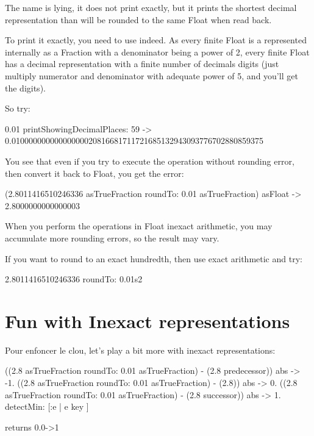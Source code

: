 \documentclass[a4paper,10pt,twoside]{book}
\begin{document}
   
   
   
The name  is lying, it does not print exactly,
but it prints the shortest decimal representation than will be rounded
to the same Float when read back.

To print it exactly, you need to use  indeed.
As every finite Float is a represented internally as a Fraction with a
denominator being a power of 2, every finite Float has a decimal
representation with a finite number of decimals digits (just multiply
numerator and denominator with adequate power of 5, and you'll get the
digits).

So try:

\begin{code}{}
0.01 printShowingDecimalPlaces: 59
-> 0.01000000000000000020816681711721685132943093776702880859375
\end{code}

You see that even if you try to execute the operation without rounding
error, then convert it back to Float, you get the error:

\begin{code}{}
(2.8011416510246336 asTrueFraction roundTo: 0.01 asTrueFraction) asFloat
->  2.8000000000000003
\end{code}

When you perform the  operations in Float inexact arithmetic,
you may accumulate more rounding errors, so the result may vary.

If you want to round to an exact hundredth, then use exact arithmetic and try:

\begin{code}{}
  2.8011416510246336 roundTo: 0.01s2
\end{code}





\section{Fun with Inexact representations}
Pour enfoncer le clou, let's play a bit more with inexact representations:

\begin{code}{}
{
((2.8 asTrueFraction roundTo: 0.01 asTrueFraction) - (2.8
predecessor)) abs -> -1.
((2.8 asTrueFraction roundTo: 0.01 asTrueFraction) - (2.8)) abs -> 0.
((2.8 asTrueFraction roundTo: 0.01 asTrueFraction) - (2.8 successor)) abs -> 1.
} detectMin: [:e | e key ]

returns
	0.0->1
\end{code}
\end{document}
